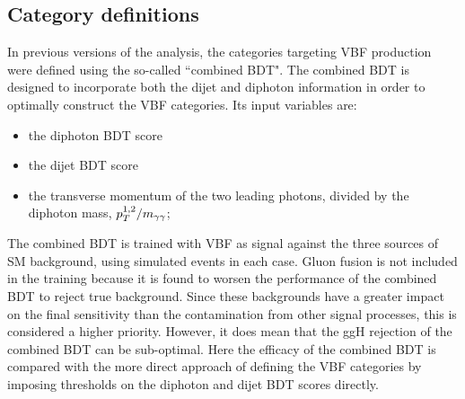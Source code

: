 \subsection{Category definitions}

In previous versions of the analysis, 
the categories targeting VBF production were defined using the so-called ``combined BDT".
The combined BDT is designed to incorporate both the dijet and diphoton information 
in order to optimally construct the VBF categories.
Its input variables are:
\begin{itemize}
\item the diphoton BDT score
\item the dijet BDT score
\item the transverse momentum of the two leading photons, divided by the diphoton mass, $p_T^{1,2}/m_{\gamma\gamma}$;
\end{itemize}
The combined BDT is trained with VBF as signal against the three sources of SM background, 
using simulated events in each case.
Gluon fusion is not included in the training because it is found to worsen the performance 
of the combined BDT to reject true background.
Since these backgrounds have a greater impact on the final sensitivity 
than the contamination from other signal processes, 
this is considered a higher priority.
However, it does mean that the ggH rejection of the combined BDT can be sub-optimal.
Here the efficacy of the combined BDT is compared with the more direct approach of 
defining the VBF categories by imposing thresholds on the diphoton and dijet BDT scores directly.

